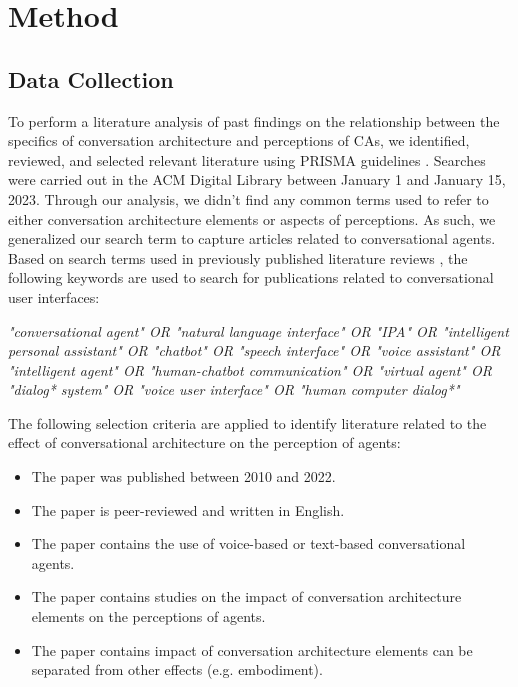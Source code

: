 
\section{Method}


\subsection{Data Collection}
To perform a literature analysis of past findings on the relationship between the specifics of conversation architecture and perceptions of CAs, we identified, reviewed, and selected relevant literature using PRISMA guidelines \cite{prisma}. %
Searches were carried out in the ACM Digital Library between January 1 and January 15, 2023. Through our analysis, we didn't find any common terms used to refer to either conversation architecture elements or aspects of perceptions. As such, we generalized our search term to capture articles related to conversational agents. Based on search terms used in previously published literature reviews \cite{clark2019state, rapp2021human}, the following keywords are used to search for publications related to conversational user interfaces:
\newline

\textit{"conversational agent" OR "natural language interface" OR "IPA" OR "intelligent personal assistant" OR "chatbot" OR "speech interface" OR "voice assistant" OR "intelligent agent" OR "human-chatbot communication" OR "virtual agent" OR "dialog* system" OR "voice user interface" OR "human computer dialog*"}
\newline

The following selection criteria are applied to identify literature related to the effect of conversational architecture on the perception of agents:
\begin{itemize}
  \item The paper was published between 2010 and 2022.
  \item The paper is peer-reviewed and written in English.
  \item The paper contains the use of voice-based or text-based conversational agents.
  \item The paper contains studies on the impact of conversation architecture elements on the perceptions of agents.
  \item The paper contains impact of conversation architecture elements can be separated from other effects (e.g. embodiment).

\end{itemize}

